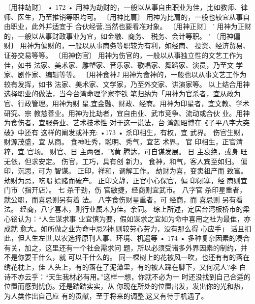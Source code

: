 〔用神劫财〕
• 172 •
用神为劫财的，一般以从事自由职业为佳，比如教师、律
师、医生，乃至推销等职均可。
〔用神比肩〕
用神为比肩的，一般也较宜从事自由职业，此外并适宜于
合伙经营,当然也要看准对象。
〔用神正财］ '
用神为正财的，一般以从事财政事业为宜，如金融、商务、
税务、会计等职。 '
〔用神偏财〕
用神为偏财的，一般以从事商务等职较为有利，如经商、
投资、经济贸易、证券交易等等。
〔用神伤官〕
用神为伤官的，一般以从事独立性的文艺工作为佳，如书
法家、美术家、雕塑家、音乐家、歌唱家、舞蹈家、演员，乃至文
学家、剧作家、编辑等等。
〔用神食神J
用神为食神的，一般也以从事文艺工作为较有发挥，如书
法家、美术家、文学家，乃至外交家、讲演家等。
以上结合用神选择职业的做法，当今台湾命理学家李铁
笔归纳为「用神为官杀者，宜从政为官、行政管理。用神为财
星,宜金融、财政、经商。用神为印星者，宜文教、学术研究、宗
教慈善业。用神为比劫者，宜自由业、武市竞争、流动或合伙
业。用神为食伤者，宜服务业、艺术技术性
对于这一说法，台 湾颜昭博在《子平八字大突破》中还有
这样的阐发或补充:
•173 •
杀印相生，有权，宜 武界。
伤官生财，财源茂盛，宜 从商。
食神吐秀，聪明、秀气，宜艺 术界。
官 印相生，正官清粹，宜 官场。
财官、日 主两强，飞黄 腾达，可自谋发展。
日 主衰绝，或身 旺无依，但求安定。
伤官，工巧，具有创 新力。
食神，和气，客人宾至如归。
偏印，沉思，可为 智谋。
正印，祥和，调解工作。
劫财为喜，变卖祖产而 致富。
劫财为忌，吃喝 嫖赌而破产。
正印文静，正官小心保官，偏 印闭塞，经 商则宜
门市（指开店）。
七 杀干劲，伤 官敏捷，经商则宜武市。
八字官 杀印星重者，就公职，而喜忌则另有着
法。
八字食伤财星重者，可 经商，而 喜忌则 另有看
法。
经商，八字喜木，则行业属木为佳。余同。
综上所述，定居台湾板桥市的梁心铭认为：“人生谋求事
业宜慎为要，假如谋求之宜如为命中喜用之社为最隹，亦成就
愈大。如所做之业为命中忌Z神,则较劳心劳力，没有那么得
心应手」
话且扣此，但人生左世,以农选择原刊人事、环境、机遇等
• 174 •
多种复杂因素的凑合有关，加之，这里还有一个社会需求问
题，所以必须受诸多外界因素的制约，并不是你要干什么，就
可以干什么的。
同一棵树上的花被风一吹，也还有有的落在绣花枕上，佳
人头上，有的落在了泥潭里，有的被人踩在脚下，又何况人?李
白诗不亦云乎：“天生我材必有用。”这样一想，你就不必为一
时还没找到自己合适的位置而感到忧伤。还是踏踏实实，从
你现在所处的位置出发，发出你的光和热，为人类作出自己应
有的贡献，至于将来的调整,这又有待于机遇了。

